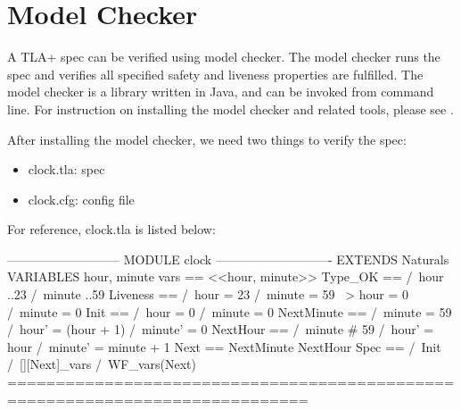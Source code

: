 \section{Model Checker}

A TLA+ spec can be verified using model checker. The model checker runs the spec
and verifies all specified safety and liveness properties are fulfilled. The
model checker is a library written in Java, and can be invoked from command
line. For instruction on installing the model checker and related tools, please
see \cite{toolbox}.\newline

After installing the model checker, we need two things to verify the spec:
\begin{itemize}
    \item clock.tla: spec 
    \item clock.cfg: config file
\end{itemize}

For reference, clock.tla is listed below:\newline

\begin{tla}
--------------------------- MODULE clock ----------------------------
EXTENDS Naturals
VARIABLES hour, minute
vars == <<hour, minute>>
Type_OK == 
    /\ hour ..23
    /\ minute ..59
Liveness ==
    /\ hour = 23 /\ minute = 59 ~> hour = 0 /\ minute = 0
Init ==
    /\ hour = 0
    /\ minute = 0
NextMinute ==
    /\ minute = 59 
    /\ hour' = (hour + 1) %
    /\ minute' = 0
NextHour == 
    /\ minute # 59
    /\ hour' = hour 
    /\ minute' = minute + 1 
Next ==
    \/ NextMinute
    \/ NextHour
Spec ==
  /\ Init
  /\ [][Next]_vars
  /\ WF_vars(Next)
=============================================================================
\end{tla}
\begin{tlatex}
\@x{}\moduleLeftDash{}\moduleRightDash\@xx{}%
%
%
%
%
%
%
%
%
%
%
%
%
%
%
%
%
%
%
%
%
%
%
%
%
%
\@x{}\bottombar\@xx{}%
\end{tlatex}

